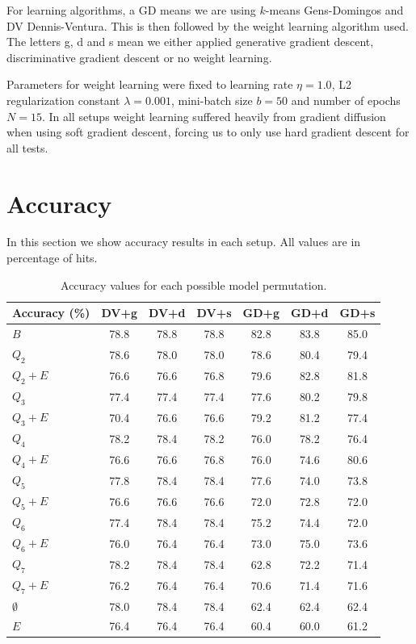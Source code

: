For learning algorithms, a GD means we are using $k$-means Gens-Domingos and DV Dennis-Ventura.
This is then followed by the weight learning algorithm used. The letters g, d and s mean we either
applied generative gradient descent, discriminative gradient descent or no weight learning.

Parameters for weight learning were fixed to learning rate $\eta=1.0$, L2 regularization constant
$\lambda=0.001$, mini-batch size $b=50$ and number of epochs $N=15$. In all setups weight learning
suffered heavily from gradient diffusion when using soft gradient descent, forcing us to only use
hard gradient descent for all tests.

\section{Accuracy}

In this section we show accuracy results in each setup. All values are in percentage of hits.

\begin{table}[h]
  \centering
  \begin{tabular}{l|c|c|c|c|c|c}
    \hline
    \multicolumn{1}{c}{\bfseries Accuracy (\%)} & \multicolumn{1}{c}{\bfseries DV+g} &
    \multicolumn{1}{c}{\bfseries DV+d} & \multicolumn{1}{c}{\bfseries DV+s} &
    \multicolumn{1}{c}{\bfseries GD+g} & \multicolumn{1}{c}{\bfseries GD+d} &
    \multicolumn{1}{c}{\bfseries GD+s}\\
    \hline
    $B$         & 78.8 & 78.8 & 78.8 & 82.8 & 83.8 & 85.0\\
    $Q_2$       & 78.6 & 78.0 & 78.0 & 78.6 & 80.4 & 79.4\\
    $Q_2+E$     & 76.6 & 76.6 & 76.8 & 79.6 & 82.8 & 81.8\\
    $Q_3$       & 77.4 & 77.4 & 77.4 & 77.6 & 80.2 & 79.8\\
    $Q_3+E$     & 70.4 & 76.6 & 76.6 & 79.2 & 81.2 & 77.4\\
    $Q_4$       & 78.2 & 78.4 & 78.2 & 76.0 & 78.2 & 76.4\\
    $Q_4+E$     & 76.6 & 76.6 & 76.8 & 76.0 & 74.6 & 80.6\\
    $Q_5$       & 77.8 & 78.4 & 78.4 & 77.6 & 74.0 & 73.8\\
    $Q_5+E$     & 76.6 & 76.6 & 76.6 & 72.0 & 72.8 & 72.0\\
    $Q_6$       & 77.4 & 78.4 & 78.4 & 75.2 & 74.4 & 72.0\\
    $Q_6+E$     & 76.0 & 76.4 & 76.4 & 73.0 & 75.0 & 73.6\\
    $Q_7$       & 78.2 & 78.4 & 78.4 & 62.8 & 72.2 & 71.4\\
    $Q_7+E$     & 76.2 & 76.4 & 76.4 & 70.6 & 71.4 & 71.6\\
    $\emptyset$ & 78.0 & 78.4 & 78.4 & 62.4 & 62.4 & 62.4\\
    $E$         & 76.4 & 76.4 & 76.4 & 60.4 & 60.0 & 61.2\\
  \end{tabular}
  \caption{Accuracy values for each possible model permutation.\label{tab:accuracy}}
\end{table}

